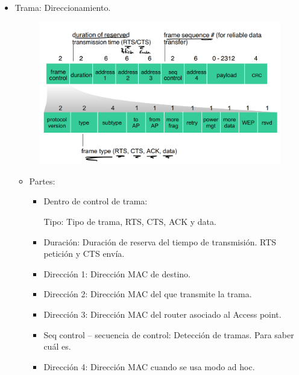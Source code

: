 \documentclass[12pt, twoside, openright]{report} %
\begin{document}
\begin{itemize}
\begin{itemize}
		      \item Trama: Direccionamiento.
		            \begin{figure}[H]
			            {\includegraphics[scale=.2]{Untitled 63.png}}
		            \end{figure}
		            \begin{itemize}
			            \item Partes:
			                  \begin{itemize}
				                  \item Dentro de control de trama:

				                        Tipo: Tipo de trama, RTS, CTS, ACK y data.

				                  \item Duración: Duración de reserva del tiempo de transmisión. RTS petición y CTS envía.
				                  \item Dirección 1: Dirección MAC de destino.
				                  \item Dirección 2: Dirección MAC del que transmite la trama.
				                  \item Dirección 3: Dirección MAC del router asociado al Access point.
				                  \item Seq control – secuencia de control: Detección de tramas. Para saber cuál es.
				                  \item Dirección 4: Dirección MAC cuando se usa modo ad hoc.
			                  \end{itemize}

		            \end{itemize}



	      \end{itemize}
\end{itemize}
\end{document}
